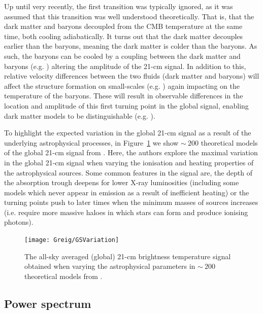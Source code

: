 Up until very recently, the first transition was typically ignored, as it was assumed that this transition was well understood theoretically. That is, that the dark matter and baryons decoupled from the CMB temperature at the same time, both cooling adiabatically. It turns out that the dark matter decouples earlier than the baryons, meaning the dark matter is colder than the baryons. As such, the baryons can be cooled by a coupling between the dark matter and baryons (e.g. \cite{Tashiro:2014}) altering the amplitude of the 21-cm signal. In addition to this, relative velocity differences between the two fluids (dark matter and baryons) will affect the structure formation on small-scales (e.g. \cite{Tseliakhovich:2010}) again impacting on the temperature of the baryons. These will result in observable differences in the location and amplitude of this first turning point in the global signal, enabling dark matter models to be distinguishable (e.g. \cite{Munoz:2015,Fialkov:2018}).

To highlight the expected variation in the global 21-cm signal as a result of the underlying astrophysical processes, in Figure~\ref{fig:global_vary} we show $\sim~200$ theoretical models of the global 21-cm signal from \cite{Cohen:2017}. Here, the authors explore the maximal variation in the global 21-cm signal when varying the ionisation and heating properties of the astrophysical sources. Some common features in the signal are, the depth of the absorption trough deepens for lower X-ray luminosities (including some models which never appear in emission as a result of inefficient heating) or the turning points push to later times when the minimum masses of sources increases (i.e. require more massive haloes in which stars can form and produce ionising photons).

\begin{figure}[]
\begin{center}
\texttt{[image: Greig/GSVariation]}
\end{center}
\caption{The all-sky averaged (global) 21-cm brightness temperature signal obtained when varying the astrophysical parameters in $\sim~200$ theoretical models from \cite{Cohen:2017}.
}
\label{fig:global_vary}
\end{figure}

\subsection{Power spectrum}

